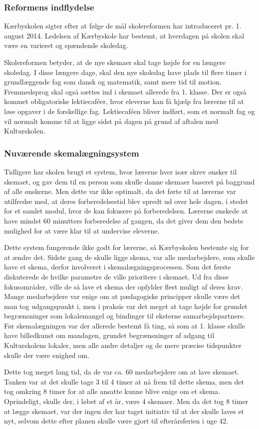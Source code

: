 \subsubsection{Reformens indflydelse}
\label{Reformens_indflydelse}
Kærbyskolen sigter efter at følge de mål skolereformen har introduceret pr. 1. august 2014. Ledelsen af Kærbyskole har bestemt, at hverdagen på skolen skal være en varieret og spændende skoledag.

Skolereformen betyder, at de nye skemaer skal tage højde for en længere skoledag. I disse længere dage, skal den nye skoledag have plads til flere timer i grundlæggende fag som dansk og matematik, samt mere tid til motion. Fremmedsprog skal også sættes ind i skemaet allerede fra 1. klasse. Der er også kommet obligatoriske lektiecaf\'eer, hvor eleverne kan få hjælp fra lærerne til at løse opgaver i de forskellige fag. Lektiecaf\'een bliver indført, som et normalt fag og vil normalt komme til at ligge sidst på dagen på grund af aftalen med Kulturskolen\cite{kaerby_skolereform}.

\subsubsection {Nuværende skemalægningsystem}
Tidligere har skolen brugt et system, hvor lærerne hver især skrev ønsker til skemaet, og gav dem til en person som skulle danne skemaer baseret på baggrund af alle ønskerne. Men dette var ikke optimalt, da det førte til at lærerne var utilfredse med, at deres forberedelsestid blev spredt ud over hele dagen, i stedet for et samlet modul, hvor de kan fokusere på forberedelsen\cite{interview_Kaerby}. Lærerne ønskede at have mindst 60 minutters forberedelse af gangen, da det giver dem den bedste mulighed for at være klar til at undervise eleverne.

Dette system fungerende ikke godt for lærerne, så Kærbyskolen bestemte sig for at ændre det. Sidste gang de skulle ligge skema, var alle medarbejdere, som skulle have et skema, derfor involveret i skemalægningsprocessen. Som det første diskuterede de hvilke parametre de ville prioritere i skemaet. Ud fra disse fokusområder, ville de så lave et skema der opfylder flest muligt af deres krav. Mange medarbejdere var enige om at pædagogiske principper skulle være det man tog udgangspunkt i, men i praksis var det meget at tage højde for grundet begrænsninger som lokalemangel og bindinger til eksterne samarbejdspartnere. Før skemalægningen var der allerede bestemt få ting, så som at 1. klasse skulle have billedkunst om mandagen, grundet begrænsninger af adgang til Kulturskolens lokaler, men alle andre detaljer og de mere præcise tidspunkter skulle der være enighed om. 

Dette tog meget lang tid, da de var ca. 60 medarbejdere om at lave skemaet. Tanken var at det skulle tage 3 til 4 timer at nå frem til dette skema, men det tog omkring 8 timer for at alle ansatte kunne blive enige om et skema. Oprindeligt, skulle der, i løbet af et år, være 4 skemaer. Men da det tog 8 timer at lægge skemaet, var der ingen der har taget initiativ til at der skulle laves et nyt, selvom dette efter planen skulle være gjort til efterårsferien i uge 42. 


